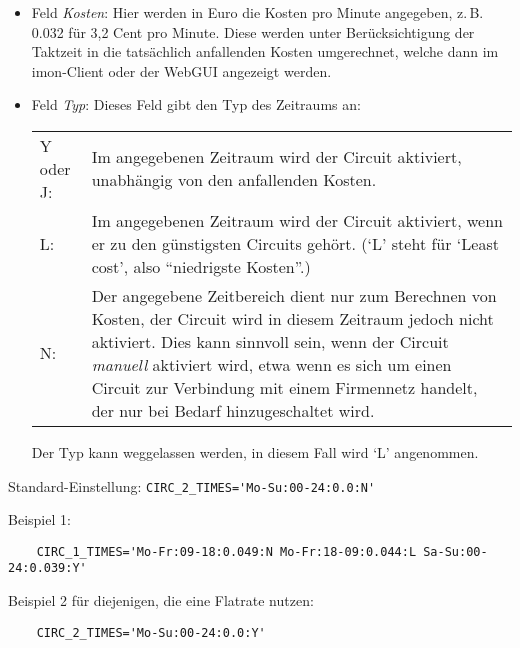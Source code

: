 \begin{description}
\begin{itemize}
\item Feld \emph{Kosten}: Hier werden in Euro die Kosten pro Minute angegeben,
z.\,B. 0.032 für 3,2 Cent pro Minute. Diese werden unter Berücksichtigung der
Taktzeit in die tatsächlich anfallenden Kosten umgerechnet, welche dann im
imon-Client oder der WebGUI angezeigt werden.

\item Feld \emph{Typ}: Dieses Feld gibt den Typ des Zeitraums an:

\begin{tabular}[h!]{lp{11cm}}
    Y oder J: & Im angegebenen Zeitraum wird der Circuit aktiviert,
                unabhängig von den anfallenden Kosten.\\
    L:        & Im angegebenen Zeitraum wird der Circuit aktiviert,
                wenn er zu den günstigsten Circuits gehört. (`L' steht für
                `Least cost', also ``niedrigste Kosten''.)\\
    N:        & Der angegebene Zeitbereich dient nur zum Berechnen
                von Kosten, der Circuit wird in diesem Zeitraum jedoch
                nicht aktiviert. Dies kann sinnvoll sein, wenn der
                Circuit \emph{manuell} aktiviert wird, etwa wenn es sich um
                einen Circuit zur Verbindung mit einem Firmennetz handelt,
                der nur bei Bedarf hinzugeschaltet wird.
\end{tabular}

 Der Typ kann weggelassen werden, in diesem Fall wird `L' angenommen.
\end{itemize}

Standard-Einstellung: \verb+CIRC_2_TIMES='Mo-Su:00-24:0.0:N'+

Beispiel 1:

\begin{example}
\begin{verbatim}
    CIRC_1_TIMES='Mo-Fr:09-18:0.049:N Mo-Fr:18-09:0.044:L Sa-Su:00-24:0.039:Y'
\end{verbatim}
\end{example}

Beispiel 2 für diejenigen, die eine Flatrate nutzen:

\begin{example}
\begin{verbatim}
    CIRC_2_TIMES='Mo-Su:00-24:0.0:Y'
\end{verbatim}
\end{example}



\end{description}
